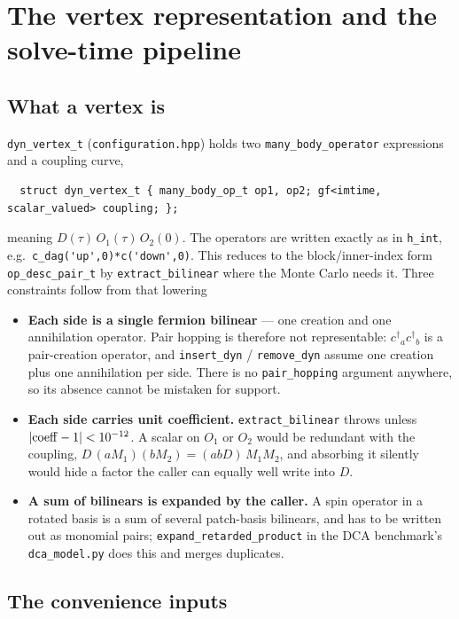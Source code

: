 \documentclass[a4paper,12pt]{article}
\renewcommand{\t}{\ensuremath{\tau}}
\newcommand{\ndag}{\ensuremath{^\dagger}}
\begin{document}
\section{The vertex representation and the solve-time pipeline}
\label{sec:api}

\subsection{What a vertex is}

\texttt{dyn\_vertex\_t} (\texttt{configuration.hpp}) holds two
\texttt{many\_body\_operator} expressions and a coupling curve,
\begin{verbatim}
  struct dyn_vertex_t { many_body_op_t op1, op2; gf<imtime, scalar_valued> coupling; };
\end{verbatim}
meaning $D(\t)\,O_1(\t)\,O_2(0)$. The operators are written exactly as in
\texttt{h\_int}, e.g.\ \verb|c_dag('up',0)*c('down',0)|. This reduces to the block/inner-index
form \texttt{op\_desc\_pair\_t} by \texttt{extract\_bilinear} where the Monte Carlo needs
it. Three constraints follow from that lowering
\begin{itemize}
  \item \textbf{Each side is a single fermion bilinear} --- one creation and one
    annihilation operator. Pair hopping is therefore not representable:
    $c\ndag_a c\ndag_b$ is a pair-creation operator, and \texttt{insert\_dyn} /
    \texttt{remove\_dyn} assume one creation plus one annihilation per side. There is no
    \texttt{pair\_hopping} argument anywhere, so its absence cannot be mistaken for
    support.
  \item \textbf{Each side carries unit coefficient.} \texttt{extract\_bilinear} throws
    unless $|{\rm coeff}-1|<10^{-12}$. A scalar on $O_1$ or $O_2$ would be redundant with
    the coupling, $D\,(aM_1)(bM_2)=(abD)\,M_1M_2$, and absorbing it silently would hide a
    factor the caller can equally well write into $D$.
  \item \textbf{A sum of bilinears is expanded by the caller.} A spin operator in a
    rotated basis is a sum of several patch-basis bilinears, and has to be written out
    as monomial pairs; \texttt{expand\_retarded\_product} in the DCA benchmark's
    \texttt{dca\_model.py} does this and merges duplicates.
\end{itemize}

\subsection{The convenience inputs}
\end{document}
